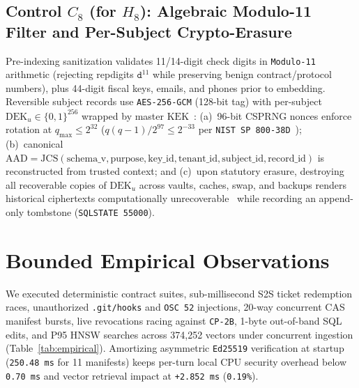 \documentclass[10pt,twocolumn]{article}
\begin{document}
\subsection{Control $C_8$ (for $H_8$): Algebraic Modulo-11 Filter and Per-Subject Crypto-Erasure}

Pre-indexing sanitization validates 11/14-digit check digits in \texttt{Modulo-11} arithmetic (rejecting repdigits $\texttt{d}^{11}$ while preserving benign contract/protocol numbers), plus 44-digit fiscal keys, emails, and phones prior to embedding. Reversible subject records use \texttt{AES-256-GCM} (128-bit tag) with per-subject $\mathrm{DEK}_u \in \{0,1\}^{256}$ wrapped by master $\mathrm{KEK}$~\cite{R06,R09}: (a)~96-bit CSPRNG nonces enforce rotation at $q_{\max} \le 2^{32}$ ($q(q-1)/2^{97} \le 2^{-33}$ per \texttt{NIST SP 800-38D}~\cite{R09}); (b)~canonical $\mathrm{AAD} = \mathrm{JCS}(\mathrm{schema\_v}, \mathrm{purpose}, \mathrm{key\_id}, \mathrm{tenant\_id}, \mathrm{subject\_id}, \mathrm{record\_id})$ is reconstructed from trusted context; and (c)~upon statutory erasure, destroying all recoverable copies of $\mathrm{DEK}_u$ across vaults, caches, swap, and backups renders historical ciphertexts computationally unrecoverable~\cite{R10,R14} while recording an append-only tombstone (\texttt{SQLSTATE 55000}).

\section{Bounded Empirical Observations}

We executed deterministic contract suites, sub-millisecond S2S ticket redemption races, unauthorized \texttt{.git/hooks} and \texttt{OSC 52} injections, 20-way concurrent CAS manifest bursts, live revocations racing against \texttt{CP-2B}, 1-byte out-of-band SQL edits, and P95 HNSW searches across 374,252 vectors under concurrent ingestion (Table~\ref{tab:empirical}). Amortizing asymmetric \texttt{Ed25519} verification at startup (\texttt{250.48 ms} for 11 manifests) keeps per-turn local CPU security overhead below \texttt{0.70 ms} and vector retrieval impact at \texttt{+2.852 ms} (\texttt{0.19\%}).
\end{document}
